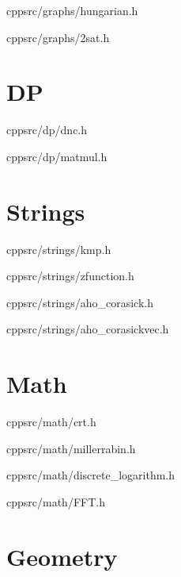 \documentclass[portrait, 8pt, a4paper, oneside, twocolumn]{extarticle}
\begin{document}
    {}
    {}
    {cpp}{src/graphs/hungarian.h}
    \noindent\hrulefill

    {}
    {}
    {cpp}{src/graphs/2sat.h}
    \noindent\hrulefill

\section{DP}
    {}
    {}
    {cpp}{src/dp/dnc.h}
    \noindent\hrulefill

    {}
    {}
    {cpp}{src/dp/matmul.h}
    \noindent\hrulefill

\section{Strings}

    {}
    {}
    {cpp}{src/strings/kmp.h}
    \noindent\hrulefill

    {}
    {}
    {cpp}{src/strings/zfunction.h}
    \noindent\hrulefill

    {}
    {}
    {cpp}{src/strings/aho_corasick.h}
    \noindent\hrulefill

    {}
    {}
    {cpp}{src/strings/aho_corasickvec.h}
    \noindent\hrulefill

    
\section{Math}

    {}
    {}
    {cpp}{src/math/crt.h}
    \noindent\hrulefill

    {}
    {}
    {cpp}{src/math/millerrabin.h}
    \noindent\hrulefill

    {}
    {}
    {cpp}{src/math/discrete_logarithm.h}
    \noindent\hrulefill

    {}
    {}
    {cpp}{src/math/FFT.h}
    \noindent\hrulefill
    
\section{Geometry}
\end{document}
